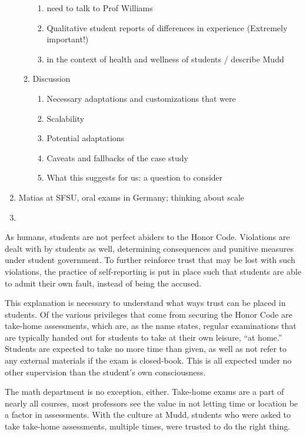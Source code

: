 \begin{enumerate}
\begin{enumerate}
\begin{enumerate}
        \item need to talk to Prof Williams
        \item Qualitative student reports of differences in experience (Extremely important!)
        \item in the context of health and wellness of students / describe Mudd
      \end{enumerate}
      \item Discussion
      \begin{enumerate}
        \item Necessary adaptations and customizations that were
        \item Scalability
        \item Potential adaptations
        \item Caveats and fallbacks of the case study
        \item What this suggests for us: a question to consider
      \end{enumerate}
    \end{enumerate}
    \item Matias at SFSU, oral exams in Germany; thinking about scale
    \item
\end{enumerate}


As humans, students are not perfect abiders to the Honor Code. Violations are dealt with by students as well, determining consequences and punitive measures under student government. To further reinforce trust that may be lost with such violations, the practice of self-reporting is put in place such that students are able to admit their own fault, instead of being the accused.

This explanation is necessary to understand what ways trust can be placed in students. Of the various privileges that come from securing the Honor Code are take-home assessments, which are, as the name states, regular examinations that are typically handed out for students to take at their own leisure, ``at home.'' Students are expected to take no more time than given, as well as not refer to any external materials if the exam is closed-book. This is all expected under no other supervision than the student's own consciousness.

The math department is no exception, either. Take-home exams are a part of nearly all courses, most professors see the value in not letting time or location be a factor in assessments. With the culture at Mudd, students who were asked to take take-home assessments, multiple times, were trusted to do the right thing.
